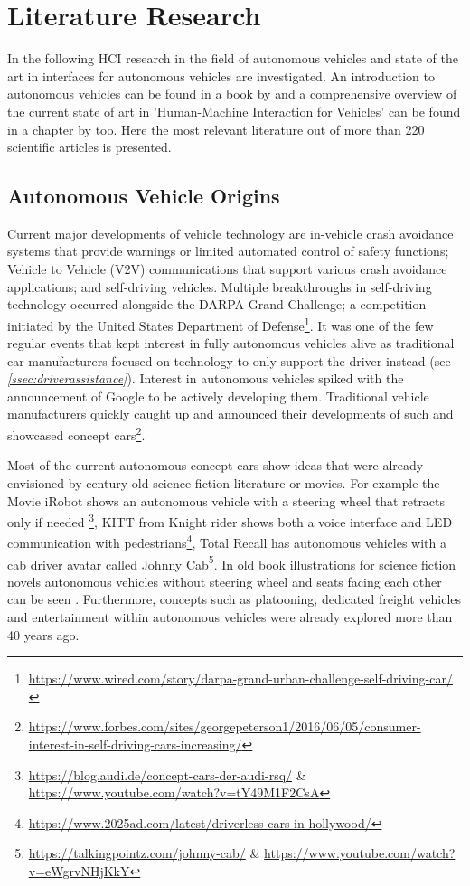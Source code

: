 \chapter{Literature Research}
\label{ch:literature}

In the following HCI research in the field of autonomous vehicles and state of the art in interfaces for autonomous vehicles are investigated. An introduction to autonomous vehicles can be found in a book by \citet{Lipson:2017:DIC:3175814} and a comprehensive overview of the current state of art in 'Human-Machine Interaction for Vehicles' can be found in a chapter by \citet{Kun2018} too. Here the most relevant literature out of more than 220 scientific articles is presented. 

\section{Autonomous Vehicle Origins}\label{sec:history}
Current major developments of vehicle technology are in-vehicle crash avoidance systems that provide warnings or limited automated control of safety functions; Vehicle to Vehicle (V2V) communications that support various crash avoidance applications; and self-driving vehicles. Multiple breakthroughs in self-driving technology occurred alongside the DARPA Grand Challenge; a competition initiated by the United States Department of Defense\footnote{\url{https://www.wired.com/story/darpa-grand-urban-challenge-self-driving-car/}}. It was one of the few regular events that kept interest in fully autonomous vehicles alive as traditional car manufacturers focused on technology to only support the driver instead (see \emph{\ref{ssec:driverassistance}}). Interest in autonomous vehicles spiked with the announcement of Google to be actively developing them. Traditional vehicle manufacturers quickly caught up and announced their developments of such and showcased concept cars\footnote{\url{https://www.forbes.com/sites/georgepeterson1/2016/06/05/consumer-interest-in-self-driving-cars-increasing/}}. 

Most of the current autonomous concept cars show ideas that were already envisioned by century-old science fiction literature or movies. For example the Movie iRobot shows an autonomous vehicle with a steering wheel that retracts only if needed \footnote{\url{https://blog.audi.de/concept-cars-der-audi-rsq/} \& \url{https://www.youtube.com/watch?v=tY49M1F2CsA}}, KITT from Knight rider shows both a voice interface and LED communication with pedestrians\footnote{\url{https://www.2025ad.com/latest/driverless-cars-in-hollywood/}}, Total Recall has autonomous vehicles with a cab driver avatar called Johnny Cab\footnote{\url{https://talkingpointz.com/johnny-cab/} \& \url{https://www.youtube.com/watch?v=eWgrvNHjKkY}}. In old book illustrations for science fiction novels autonomous vehicles without steering wheel and seats facing each other can be seen \citep{Radtke1974DieMorgen}. Furthermore, concepts such as platooning, dedicated freight vehicles and entertainment within autonomous vehicles were already explored more than 40 years ago. 

